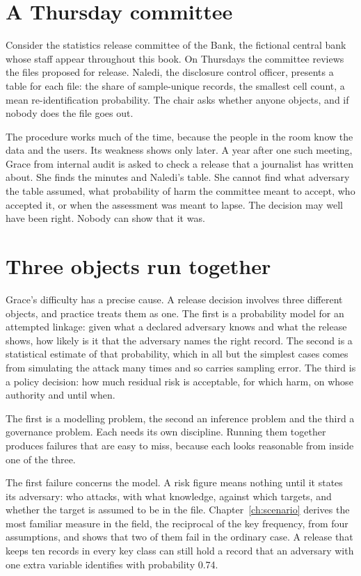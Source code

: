 \section{A Thursday committee}

Consider the statistics release committee of the Bank, the fictional central bank whose
staff appear throughout this book. On Thursdays the committee reviews the files proposed
for release. Naledi, the disclosure control officer, presents a table for each file: the
share of sample-unique records, the smallest cell count, a mean re-identification
probability. The chair asks whether anyone objects, and if nobody does the file goes out.

The procedure works much of the time, because the people in the room know the data and
the users. Its weakness shows only later. A year after one such meeting, Grace from
internal audit is asked to check a release that a journalist has written about. She finds
the minutes and Naledi's table. She cannot find what adversary the table assumed, what
probability of harm the committee meant to accept, who accepted it, or when the
assessment was meant to lapse. The decision may well have been right. Nobody can show
that it was.

\section{Three objects run together}

Grace's difficulty has a precise cause. A release decision involves three different
objects, and practice treats them as one. The first is a probability model for an
attempted linkage: given what a declared adversary knows and what the release shows, how
likely is it that the adversary names the right record. The second is a statistical
estimate of that probability, which in all but the simplest cases comes from simulating
the attack many times and so carries sampling error. The third is a policy decision: how
much residual risk is acceptable, for which harm, on whose authority and until when.

The first is a modelling problem, the second an inference problem and the third a
governance problem. Each needs its own discipline. Running them together produces failures
that are easy to miss, because each looks reasonable from inside one of the three.

The first failure concerns the model. A risk figure means nothing until it states its
adversary: who attacks, with what knowledge, against which targets, and whether the target
is assumed to be in the file. Chapter~\ref{ch:scenario} derives the most familiar measure
in the field, the reciprocal of the key frequency, from four assumptions, and shows that
two of them fail in the ordinary case. A release that keeps ten records in every key class
can still hold a record that an adversary with one extra variable identifies with
probability 0.74.

